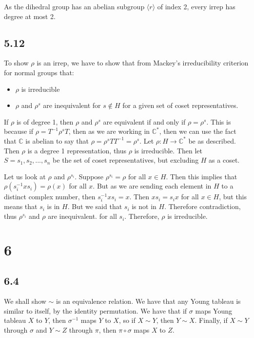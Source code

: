 \documentclass[]{article}
\begin{document}
As the dihedral group has an abelian subgroup $\langle r \rangle$ of index 2, every irrep has degree at most 2.

\subsection*{5.12}
To show $\rho$ is an irrep, we have to show that from Mackey's irreducibility criterion for normal groups that:
\begin{itemize}
	\item $\rho$ is irreducible
	\item $\rho$ and $\rho^s$ are inequivalent for $s \notin H$ for a given set of coset representatives.
\end{itemize}
If $\rho$ is of degree 1, then $\rho$ and $\rho^s$ are equivalent if and only if $\rho = \rho^s$. This is because if $\rho = T^{-1} \rho^s T$, then as we are working in $\mathbb{C}^*$, then we can use the fact that $\mathbb{C}$ is abelian to say that $\rho = \rho^s T T^{-1} = \rho^s$.   
Let $\rho : H \rightarrow \mathbb{C}^*$ be as described. Then $\rho$ is a degree 1 representation, thus $\rho$ is irreducible. Then let $S = {s_1, s_2, ..., s_n}$ be the set of coset representatives, but excluding $H$ as a coset.

Let us look at $\rho$ and $\rho^{s_i}$. Suppose $\rho^{s_i} = \rho$ for all $x \in H$. Then this implies that $\rho(s_i^{-1} x s_i) = \rho(x)$ for all $x$. But as we are sending each element in $H$ to a distinct complex number, then $s_i^{-1} x s_i = x$. Then $x s_i = s_i x$ for all $x \in H$, but this means that $s_i$ is in $H$. But we said that $s_i$ is not in $H$. Therefore contradiction, thus $\rho^{s_i}$ and $\rho$ are inequivalent. for all $s_i$. Therefore, $\rho$ is irreducible. 

\section*{6}
\subsection*{6.4}
We shall show $\sim$ is an equivalence relation. We have that any Young tableau is similar to itself, by the identity permutation. We have that if $\sigma$ maps Young tableau $X$ to $Y$, then $\sigma^{-1}$ maps $Y$ to $X$, so if $X \sim Y$, then $Y \sim X$. Finally, if $X \sim Y$ through $\sigma$ and $Y \sim Z$ through $\pi$, then $\pi \circ \sigma$ maps $X$ to $Z$. 
\end{document}
